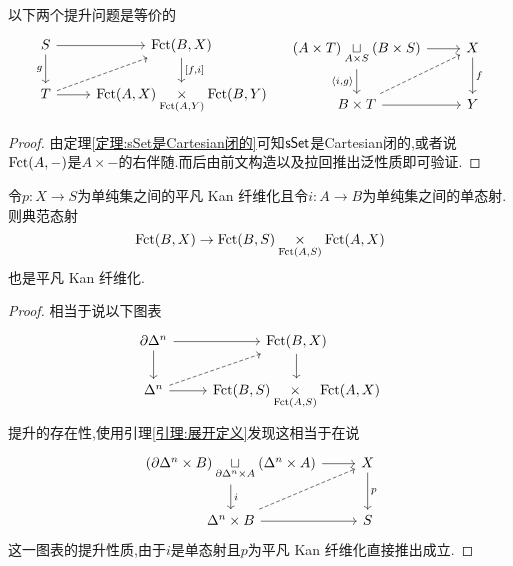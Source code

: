 \begin{lemma}\label{引理:展开定义}
    以下两个提升问题是等价的
    \[\begin{tikzcd}
	S & {\Fct(B,X)} \\
	T & {\Fct(A,X)\dtimes{\Fct(A,Y)}\Fct(B,Y)}
	\arrow[from=1-1, to=1-2]
	\arrow["g"', from=1-1, to=2-1]
	\arrow["{[f,i]}", from=1-2, to=2-2]
	\arrow[dashed, from=2-1, to=1-2]
	\arrow[from=2-1, to=2-2]
\end{tikzcd}\quad \begin{tikzcd}
	{(A\times T)\dsqcup{A \times S} (B\times S)} & X \\
	{B\times T} & Y
	\arrow[from=1-1, to=1-2]
	\arrow["{\left<i,g\right>}"', from=1-1, to=2-1]
	\arrow["f", from=1-2, to=2-2]
	\arrow[dashed, from=2-1, to=1-2]
	\arrow[from=2-1, to=2-2]
\end{tikzcd}\]
\end{lemma}
\begin{proof}
    由定理\ref{定理:sSet是Cartesian闭的}可知$\mathsf{sSet}$是Cartesian闭的,或者说$\operatorname{Fct}(A,-)$是$A\times -$的右伴随.而后由前文构造以及拉回推出泛性质即可验证.
\end{proof}
\begin{corollary}\label{推论:态射空间纤维积平凡Kan纤维化}
    令$p:X\to S$为单纯集之间的平凡 Kan 纤维化且令$i :A \to B$为单纯集之间的单态射.则典范态射
    \[
        \operatorname{Fct}(B,X) \to \operatorname{Fct}(B,S) \underset{\operatorname{Fct}(A,S)}{\times} \operatorname{Fct}(A,X)
    \]
    也是平凡 Kan 纤维化.
\end{corollary}
\begin{proof}
    相当于说以下图表
    \[\begin{tikzcd}
	{\partial \Delta^n} & {\Fct(B,X)} \\
	{\Delta^n} & {\Fct(B,S) \dtimes{\Fct(A,S)} \Fct(A,X)}
	\arrow[from=1-1, to=1-2]
	\arrow[from=1-1, to=2-1]
	\arrow[from=1-2, to=2-2]
	\arrow[dashed, from=2-1, to=1-2]
	\arrow[from=2-1, to=2-2]
    \end{tikzcd}\]
    提升的存在性,使用引理\ref{引理:展开定义}发现这相当于在说
    \[\begin{tikzcd}
	{(\partial \Delta^n \times B)\dsqcup{\partial \Delta^n \times A}(\Delta^n \times A)} & X \\
	{\Delta^n \times B} & S
	\arrow[from=1-1, to=1-2]
	\arrow["i", from=1-1, to=2-1]
	\arrow["p", from=1-2, to=2-2]
	\arrow[dashed, from=2-1, to=1-2]
	\arrow[from=2-1, to=2-2]
    \end{tikzcd}\]
    这一图表的提升性质,由于$i$是单态射且$p$为平凡 Kan 纤维化直接推出成立.
\end{proof}

